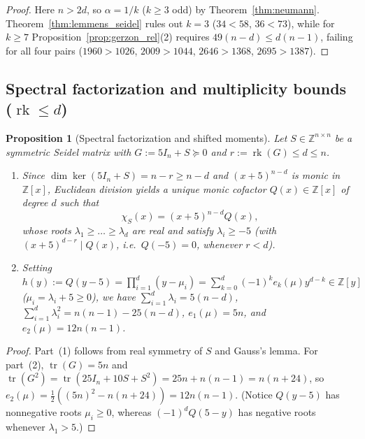 \documentclass[11pt,reqno]{amsart}
\newtheorem{proposition}[theorem]{Proposition}
\theoremstyle{definition}
\theoremstyle{remark}
\numberwithin{equation}{section}
\numberwithin{table}{section}
\DeclareMathOperator{\tr}{tr}
\DeclareMathOperator{\rk}{rk}
\begin{document}
\begin{proof}
Here $n > 2d$, so $\alpha = 1/k$ ($k \ge 3$ odd) by Theorem~\ref{thm:neumann}. Theorem~\ref{thm:lemmens_seidel} rules out $k = 3$ ($34 < 58$, $36 < 73$), while for $k \ge 7$ Proposition~\ref{prop:gerzon_rel}(2) requires $49(n - d) \le d(n - 1)$, failing for all four pairs ($1960 > 1026$, $2009 > 1044$, $2646 > 1368$, $2695 > 1387$).
\end{proof}

\subsection{Spectral factorization and multiplicity bounds (\texorpdfstring{$\rk \le d$}{rk <= d})}
\begin{proposition}[Spectral factorization and shifted moments]\label{prop:spectral_fac}
Let $S \in \mathbb{Z}^{n \times n}$ be a symmetric Seidel matrix with $G := 5I_n + S \succeq 0$ and $r := \rk(G) \le d \le n$.
\begin{enumerate}
  \item Since $\dim\ker(5I_n + S) = n - r \ge n - d$ and $(x + 5)^{n - d}$ is monic in $\mathbb{Z}[x]$, Euclidean division yields a unique monic cofactor $Q(x) \in \mathbb{Z}[x]$ of degree $d$ such that
  \begin{equation}\label{eq:cofactor_Q}
    \chi_S(x) = (x + 5)^{n - d} Q(x),
  \end{equation}
  whose roots $\lambda_1 \ge \dots \ge \lambda_d$ are real and satisfy $\lambda_i \ge -5$ (with $(x + 5)^{d - r} \mid Q(x)$, i.e.\ $Q(-5) = 0$, whenever $r < d$).
  \item Setting $h(y) := Q(y - 5) = \prod_{i=1}^d (y - \mu_i) = \sum_{k=0}^d (-1)^k e_k(\mu) y^{d - k} \in \mathbb{Z}[y]$ ($\mu_i = \lambda_i + 5 \ge 0$), we have $\sum_{i=1}^d \lambda_i = 5(n - d)$, $\sum_{i=1}^d \lambda_i^2 = n(n - 1) - 25(n - d)$, $e_1(\mu) = 5n$, and $e_2(\mu) = 12n(n - 1)$.
\end{enumerate}
\end{proposition}

\begin{proof}
Part~(1) follows from real symmetry of $S$ and Gauss's lemma. For part~(2), $\tr(G) = 5n$ and $\tr(G^2) = \tr(25I_n + 10S + S^2) = 25n + n(n - 1) = n(n + 24)$, so $e_2(\mu) = \frac{1}{2}((5n)^2 - n(n + 24)) = 12n(n - 1)$. (Notice $Q(y - 5)$ has nonnegative roots $\mu_i \ge 0$, whereas $(-1)^d Q(5 - y)$ has negative roots whenever $\lambda_1 > 5$.)
\end{proof}
\end{document}
